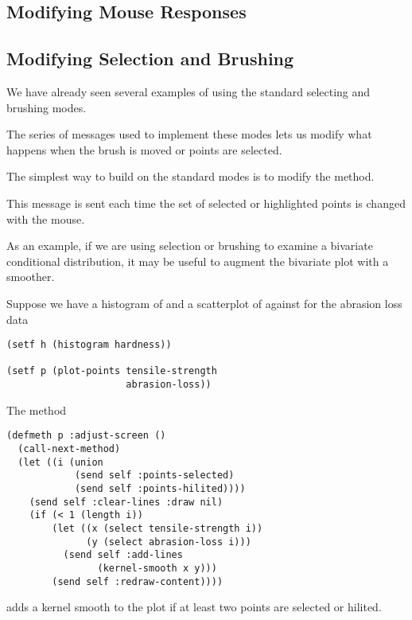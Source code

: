 \begin{slide}{}
\section{Modifying Mouse Responses}

\subsection{Modifying Selection and Brushing}
We have already seen several examples of using the standard selecting
and brushing modes.

The series of messages used to implement these modes lets us modify
what happens when the brush is moved or points are selected.

The simplest way to build on the standard modes is to modify the
 method.

This message is sent each time the set of selected or highlighted
points is changed with the mouse.

As an example, if we are using selection or brushing to examine a
bivariate conditional distribution, it may be useful to augment the
bivariate plot with a smoother.
\end{slide}

\begin{slide}{}
Suppose we have a histogram of  and a scatterplot of
 against  for the
abrasion loss data {\Large
\begin{verbatim}
(setf h (histogram hardness))

(setf p (plot-points tensile-strength
                     abrasion-loss))
\end{verbatim}}
The method
{\Large
\begin{verbatim}
(defmeth p :adjust-screen ()
  (call-next-method)
  (let ((i (union
            (send self :points-selected)
            (send self :points-hilited))))
    (send self :clear-lines :draw nil)
    (if (< 1 (length i))
        (let ((x (select tensile-strength i))
              (y (select abrasion-loss i)))
          (send self :add-lines
                (kernel-smooth x y)))
        (send self :redraw-content))))
\end{verbatim}}
adds a kernel smooth to the plot if at least two points are selected
or hilited.
\end{slide}


